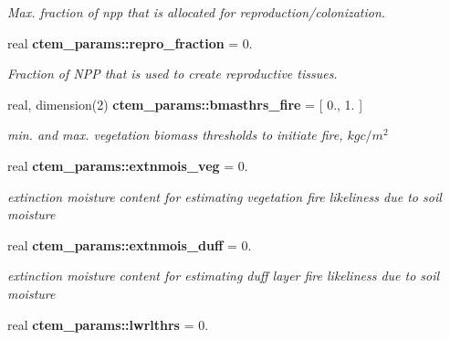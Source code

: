 \begin{DoxyCompactItemize}
\begin{DoxyCompactList}\small\item\em Max. fraction of npp that is allocated for reproduction/colonization. \end{DoxyCompactList}\item 
\hypertarget{namespacectem__params_a4b02c06a75e1eba7cae5f864b099bb0d}{}real {\bfseries ctem\+\_\+params\+::repro\+\_\+fraction} = 0.\label{namespacectem__params_a4b02c06a75e1eba7cae5f864b099bb0d}

\begin{DoxyCompactList}\small\item\em Fraction of N\+P\+P that is used to create reproductive tissues. \end{DoxyCompactList}\item 
\hypertarget{namespacectem__params_a62e7197e6f7c9c31dc86998dc8c9ebf2}{}real, dimension(2) {\bfseries ctem\+\_\+params\+::bmasthrs\+\_\+fire} = \mbox{[} 0., 1. \mbox{]}\label{namespacectem__params_a62e7197e6f7c9c31dc86998dc8c9ebf2}

\begin{DoxyCompactList}\small\item\em min. and max. vegetation biomass thresholds to initiate fire, $kg c/m^2$ \end{DoxyCompactList}\item 
\hypertarget{namespacectem__params_a79ef480de23397cf798e7350991780f3}{}real {\bfseries ctem\+\_\+params\+::extnmois\+\_\+veg} = 0.\label{namespacectem__params_a79ef480de23397cf798e7350991780f3}

\begin{DoxyCompactList}\small\item\em extinction moisture content for estimating vegetation fire likeliness due to soil moisture \end{DoxyCompactList}\item 
\hypertarget{namespacectem__params_a5783396d006dd77848beec6e321443b7}{}real {\bfseries ctem\+\_\+params\+::extnmois\+\_\+duff} = 0.\label{namespacectem__params_a5783396d006dd77848beec6e321443b7}

\begin{DoxyCompactList}\small\item\em extinction moisture content for estimating duff layer fire likeliness due to soil moisture \end{DoxyCompactList}\item 
\hypertarget{namespacectem__params_a4e6ad236fa1a30bbc7841a03cce0fb37}{}real {\bfseries ctem\+\_\+params\+::lwrlthrs} = 0.\label{namespacectem__params_a4e6ad236fa1a30bbc7841a03cce0fb37}


\end{DoxyCompactItemize}
